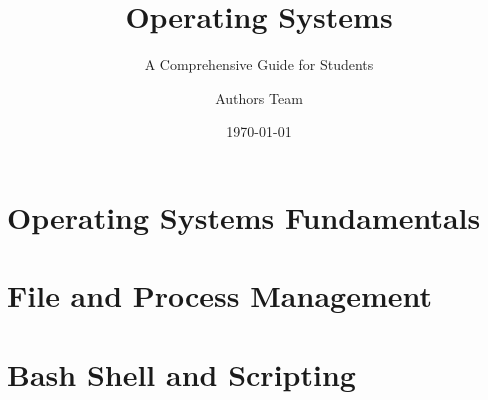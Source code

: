 \documentclass[
    a4paper,          %
    12pt,             %
    twoside,          %
    openany,          %
    bibliography=totoc, %
]{scrbook}            %
\title{Operating Systems}
\subtitle{A Comprehensive Guide for Students}
\author{Authors Team}
\date{\today}
\begin{document}
\frontmatter









\tableofcontents

\listoffigures

\listoftables

\lstlistoflistings

\mainmatter

\part{Operating Systems Fundamentals}







\part{File and Process Management}





\part{Bash Shell and Scripting}
\end{document}
